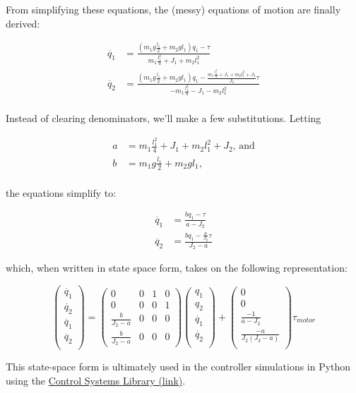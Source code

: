 \documentclass[12pt]{article}
\begin{document}
From simplifying these equations, the (messy) equations of motion are finally derived:


\begin{align*}
	\ddot{q_1} &= \frac{(m_1 g \frac{l_1}{2} + m_2 g l_1)q_1 - \tau}{m_1 \frac{l_1^2}{4} + J_1 + m_2 l_1^2} \\
	\ddot{q_2} &= \frac{(m_1 g \frac{l_1}{2} + m_2 g l_1)q_1 - \frac{m_1\frac{l_1^2}{4} + J_1 + m_2 l_1^2 + J_2}{J_2}\tau}{-m_1 \frac{l_1^2}{4} - J_1 - m_2 l_1^2} \\
\end{align*}

Instead of clearing denominators, we'll make a few substitutions.  Letting

\begin{align*}
	a &= m_1 \frac{l_1^2}{4} + J_1 + m_2 l_1^2 + J_2, \,\text{and} \\
	b &= m_1 g \frac{l_1}{2} + m_2 g l_1, \\
\end{align*}

the equations simplify to:

\begin{align*}
	\ddot{q_1} &= \frac{b q_1 - \tau}{a-J_2} \\
	\ddot{q_2} &= \frac{b q_1 - \frac{a}{J_2} \tau}{J_2 - a}
\end{align*}

which, when written in state space form, takes on the following representation:

\begin{equation*}
\begin{pmatrix} 
\dot{q_1}  \\
\dot{q_2} \\
\ddot{q_1} \\
\ddot{q_2} \\ 
\end{pmatrix}
= 
\begin{pmatrix}
0 & 0 & 1 & 0 \\
0 & 0 & 0 & 1 \\
\frac{b}{J_2-a} & 0 & 0 & 0 \\
\frac{b}{J_2 - a} & 0 & 0 & 0
\end{pmatrix}
\begin{pmatrix} 
q_1  \\
q_2 \\
\dot{q_1} \\
\dot{q_2} \\ 
\end{pmatrix}
+ 
\begin{pmatrix}
0 \\
0 \\
\frac{-1}{a-J_2} \\
\frac{-a}{J_2(J_2 - a)}\\
\end{pmatrix}
\tau_{motor}
\end{equation*}
\bigskip

This state-space form is ultimately used in the controller simulations in Python using the
 \href{https://pypi.org/project/control/}{Control Systems Library (link)}.
\end{document}
